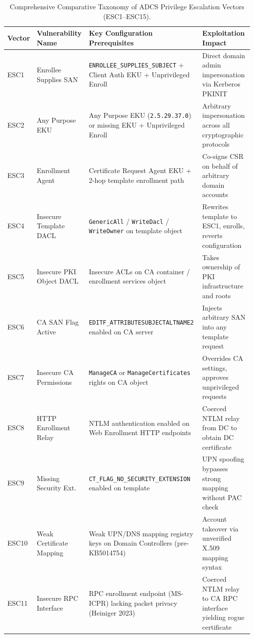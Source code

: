 \begin{table}[ht]
\centering
\footnotesize
\caption{Comprehensive Comparative Taxonomy of ADCS Privilege Escalation Vectors (ESC1--ESC15).}
\label{tab:esc_taxonomy}
\begin{tabularx}{\textwidth}{l >{\hsize=0.7\hsize\raggedright\arraybackslash}X >{\hsize=1.15\hsize\raggedright\arraybackslash}X >{\hsize=1.15\hsize\raggedright\arraybackslash}X}
\toprule
\textbf{Vector} & \textbf{Vulnerability Name} & \textbf{Key Configuration Prerequisites} & \textbf{Exploitation Impact} \\
\midrule
ESC1 & Enrollee Supplies SAN & \texttt{ENROLLEE\_SUPPLIES\_SUBJECT} + Client Auth EKU + Unprivileged Enroll & Direct domain admin impersonation via Kerberos PKINIT \\
ESC2 & Any Purpose EKU & Any Purpose EKU (\texttt{2.5.29.37.0}) or missing EKU + Unprivileged Enroll & Arbitrary impersonation across all cryptographic protocols \\
ESC3 & Enrollment Agent & Certificate Request Agent EKU + 2-hop template enrollment path & Co-signs CSR on behalf of arbitrary domain accounts \\
ESC4 & Insecure Template DACL & \texttt{GenericAll} / \texttt{WriteDacl} / \texttt{WriteOwner} on template object & Rewrites template to ESC1, enrolls, reverts configuration \\
ESC5 & Insecure PKI Object DACL & Insecure ACLs on CA container / enrollment services object & Takes ownership of PKI infrastructure and roots \\
ESC6 & CA SAN Flag Active & \texttt{EDITF\_ATTRIBUTE}\allowbreak\texttt{SUBJECTALTNAME2} enabled on CA server & Injects arbitrary SAN into any template request \\
ESC7 & Insecure CA Permissions & \texttt{ManageCA} or \texttt{ManageCertificates} rights on CA object & Overrides CA settings, approves unprivileged requests \\
ESC8 & HTTP Enrollment Relay & NTLM authentication enabled on Web Enrollment HTTP endpoints & Coerced NTLM relay from DC to obtain DC certificate \\
ESC9 & Missing Security Ext. & \texttt{CT\_FLAG\_NO\_SECURITY\_EXTENSION} enabled on template & UPN spoofing bypasses strong mapping without PAC check \\
ESC10 & Weak Certificate Mapping & Weak UPN/DNS mapping registry keys on Domain Controllers (pre-KB5014754) & Account takeover via unverified X.509 mapping syntax \\
ESC11 & Insecure RPC Interface & RPC enrollment endpoint (MS-ICPR) lacking packet privacy (Heiniger 2023) & Coerced NTLM relay to CA RPC interface yielding rogue certificate \\

\end{tabularx}
\end{table}
